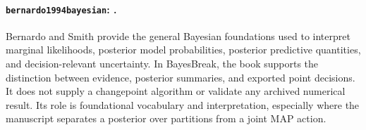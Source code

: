 
\paragraph{\texttt{bernardo1994bayesian}: \citet{bernardo1994bayesian}.}
Bernardo and Smith provide the general Bayesian foundations used to interpret marginal likelihoods, posterior model probabilities, posterior predictive quantities, and decision-relevant uncertainty. In BayesBreak, the book supports the distinction between evidence, posterior summaries, and exported point decisions. It does not supply a changepoint algorithm or validate any archived numerical result. Its role is foundational vocabulary and interpretation, especially where the manuscript separates a posterior over partitions from a joint MAP action.
